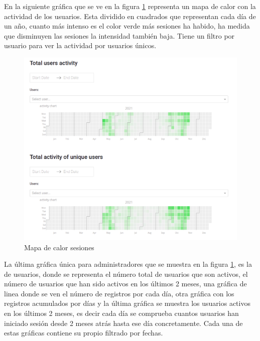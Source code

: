 En la siguiente gráfica que se ve en la figura \ref{fig:activity} representa un mapa de calor con la actividad de los usuarios. Esta dividido en cuadrados que representan cada día de un año, cuanto más intenso es el color verde más sesiones ha habido, ha medida que disminuyen las sesiones la intensidad también baja. Tiene un filtro por usuario para ver la actividad por usuarios únicos.


\begin{figure}[H]
    \centering
    \includegraphics[width=17cm, keepaspectratio]{img/activity.png}
    \caption{Mapa de calor sesiones}
    \label{fig:activity}
\end{figure}
\newpage
La última gráfica única para administradores que se muestra en la figura \ref{fig:activity}, es la de usuarios, donde se representa el número total de usuarios que son activos, el número de usuarios que han sido activos en los últimos 2 meses, una gráfica de linea donde se ven el número de registros por cada día, otra gráfica con los registros acumulados por días y la última gráfica se muestra los usuarios activos en los últimos 2 meses, es decir cada día se comprueba cuantos usuarios han iniciado sesión desde 2 meses atrás hasta ese día concretamente. Cada una de estas gráficas contiene su propio filtrado por fechas.

